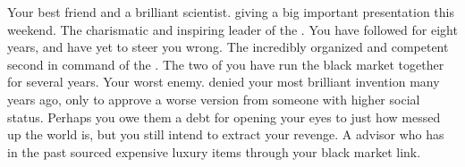 \documentclass[char]{GL2020}
\begin{document}
\begin{contacts}
	\contact{\cHeadScientist{}} Your best friend and a brilliant scientist. \cHeadScientist{\They} \cHeadScientist{\are} giving a big important presentation this weekend.
	\contact{\cChupLeader{}} The charismatic and inspiring leader of the \pGoaties{}. You have followed \cChupLeader{\them} for eight years, and \cChupLeader{\they} have yet to steer you wrong.
	\contact{\cChupSecond{}} The incredibly organized and competent second in command of the \pGoaties{}. The two of you have run the black market together for several years.
	\contact{\cAntiChup{}} Your worst enemy. \cAntiChup{\They} denied your most brilliant invention many years ago, only to approve a worse version from someone with higher social status. Perhaps you owe them a debt for opening your eyes to just how messed up the world is, but you still intend to extract your revenge.
\contact{\cHedonist{}} A \pFarm{} advisor who has in the past sourced expensive luxury items through your black market link.
\end{contacts}
\end{document}
